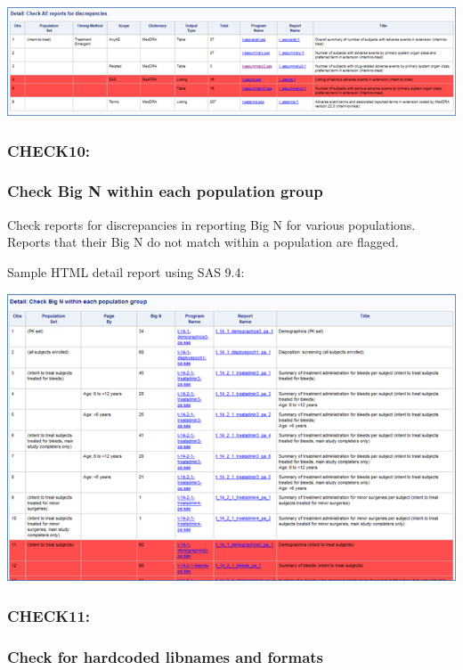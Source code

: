 \documentclass[
  letterpaper,
  DIV=11,
  numbers=noendperiod]{scrartcl}
\begin{document}
\includegraphics{image/Picture11.png}

\hypertarget{check10}{%
\subsubsection{CHECK10:}\label{check10}}

\hypertarget{check-big-n-within-each-population-group}{%
\subsubsection{Check Big N within each population
group}\label{check-big-n-within-each-population-group}}

Check reports for discrepancies in reporting Big N for various
populations.~ Reports that their Big N do not match within a population
are flagged.

Sample HTML detail report using SAS 9.4:

\includegraphics[width=5.84375in,height=\textheight]{image/Picture12.png}

\hypertarget{check11}{%
\subsubsection{CHECK11:}\label{check11}}

\hypertarget{check-for-hardcoded-libnames-and-formats}{%
\subsubsection{Check for hardcoded libnames and
formats}\label{check-for-hardcoded-libnames-and-formats}}
\end{document}

